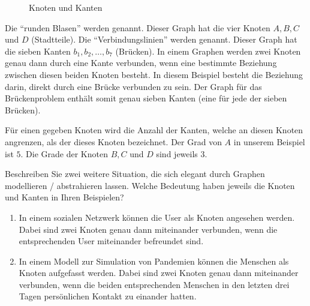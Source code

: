\begin{figure}[H]
	\centering
	\caption{Knoten und Kanten}
	\label{fig:kanten}
\end{figure}

\noindent
Die \enquote{runden Blasen} werden \tib{\textcolor{Red}{Knoten}} genannt. Dieser Graph hat die vier Knoten $A, B, C$ und $D$ (Stadtteile). Die \enquote{Verbindungslinien} werden \tib{\textcolor{Blue}{Kanten}} genannt. Dieser Graph hat die sieben Kanten $b_1,b_2, \ldots, b_7$ (Brücken). In einem Graphen werden zwei Knoten genau dann durch eine Kante verbunden, wenn eine bestimmte Beziehung zwischen diesen beiden Knoten besteht. In diesem Beispiel besteht die Beziehung darin, direkt durch eine Brücke verbunden zu sein. Der Graph für das Brückenproblem enthält somit genau sieben Kanten (eine für jede der sieben Brücken).

Für einen gegeben Knoten wird die Anzahl der Kanten, welche an diesen Knoten angrenzen, als der  dieses Knoten bezeichnet. Der Grad von $A$ in unserem Beispiel ist $5$. Die Grade der Knoten $B, C$ und $D$ sind jeweils $3$.

\begin{myexercise}\label{myexercise:01}
	Beschreiben Sie zwei weitere Situation, die sich elegant durch Graphen modellieren / abstrahieren lassen.
	Welche Bedeutung haben jeweils die Knoten und Kanten in Ihren Beispielen?
	\begin{myanswer}\label{myexercise:01-sol}
		\begin{enumerate}
			\item In einem sozialen Netzwerk können die User als Knoten angesehen werden. Dabei sind zwei Knoten genau dann miteinander verbunden, wenn die entsprechenden User miteinander befreundet sind.
			\item In einem Modell zur Simulation von Pandemien können die Menschen als Knoten aufgefasst werden. Dabei sind zwei Knoten genau dann miteinander verbunden, wenn die beiden entsprechenden Menschen in den letzten drei Tagen persönlichen Kontakt zu einander hatten.
		\end{enumerate}
	\end{myanswer}
\end{myexercise}

